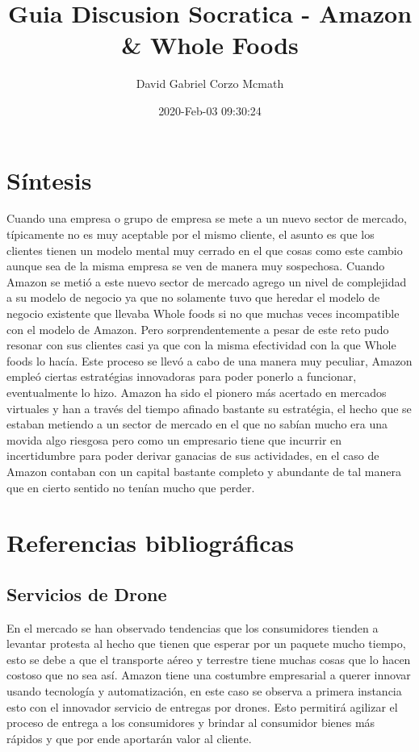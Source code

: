 \documentclass{article}
\title{Guia Discusion Socratica - Amazon \& Whole Foods}
\author{David Gabriel Corzo Mcmath}
\date{2020-Feb-03 09:30:24}
\begin{document}
\maketitle

\section{Síntesis}
Cuando una empresa o grupo de empresa se mete a un nuevo sector de mercado, típicamente no es muy aceptable por el mismo cliente, el asunto es que los clientes tienen un modelo mental muy cerrado en el que cosas como este cambio aunque sea de la misma empresa se ven de manera muy sospechosa. Cuando Amazon se metió a este nuevo sector de mercado agrego un nivel de complejidad a su modelo de negocio ya que no solamente tuvo que heredar el modelo de negocio existente que llevaba Whole foods si no que muchas veces incompatible con el modelo de Amazon. Pero sorprendentemente a pesar de este reto pudo resonar con sus clientes casi ya que con la misma efectividad con la que Whole foods lo hacía. Este proceso se llevó a cabo de una manera muy peculiar, Amazon empleó ciertas estratégias innovadoras para poder ponerlo a funcionar, eventualmente lo hizo. Amazon ha sido el pionero más acertado en mercados virtuales y han a través del tiempo afinado bastante su estratégia, el hecho que se estaban metiendo a un sector de mercado en el que no sabían mucho era una movida algo riesgosa pero como un empresario tiene que incurrir en incertidumbre para poder derivar ganacias de sus actividades, en el caso de Amazon contaban con un capital bastante completo y abundante de tal manera que en cierto sentido no tenían mucho que perder.

\section{Referencias bibliográficas}
\subsection{Servicios de Drone}
En el mercado se han observado tendencias que los consumidores tienden a levantar protesta al hecho que tienen que esperar por un paquete mucho tiempo, esto se debe a que el transporte aéreo y terrestre tiene muchas cosas que lo hacen costoso que no sea así. Amazon tiene una costumbre empresarial a querer innovar usando tecnología y automatización, en este caso se observa a primera instancia esto con el innovador servicio de entregas por drones. Esto permitirá agilizar el proceso de entrega a los consumidores y brindar al consumidor bienes más rápidos y que por ende aportarán valor al cliente.
\url{}
\end{document}
